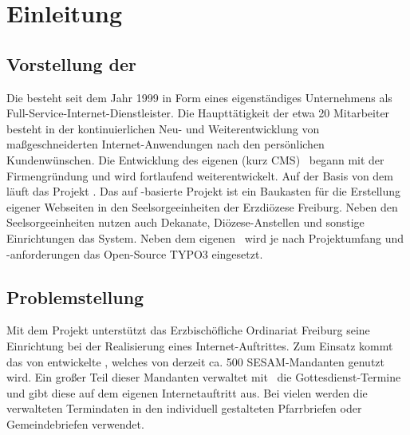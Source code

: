 \chapter{Einleitung}\label{einleitung}

\section{Vorstellung der \webco}
Die \webco besteht seit dem Jahr 1999 in Form eines eigenständiges Unternehmens als Full-Service-Internet-Dienstleister. Die Haupttätigkeit der etwa 20 Mitarbeiter besteht in der kontinuierlichen Neu- und Weiterentwicklung von maßgeschneiderten Internet-Anwendungen nach den persönlichen Kundenwünschen. Die Entwicklung des eigenen \cms (kurz CMS) \edith \, begann mit der Firmengründung und wird fortlaufend weiterentwickelt. Auf der Basis von dem \cmsEdith\, läuft das Projekt \qmUO{\sesam}. 
\abschnitt
Das auf \edith-basierte Projekt \qmUO{\sesam} ist ein Baukasten für die Erstellung eigener Webseiten in den Seelsorgeeinheiten der Erzdiözese Freiburg. Neben den Seelsorgeeinheiten nutzen auch Dekanate, Diözese-Anstellen und sonstige Einrichtungen das System.
\abschnitt
Neben dem eigenen \cmsEdith\, wird je nach Projektumfang und -anforderungen das Open-Source \cms TYPO3 eingesetzt.


\section{Problemstellung} \label{problemstellung}
Mit dem Projekt  unterstützt das Erzbischöfliche Ordinariat Freiburg seine Einrichtung bei der Realisierung eines Internet-Auftrittes. Zum Einsatz kommt das von \webco entwickelte \cmsEdith, welches von derzeit ca. 500 SESAM-Mandanten genutzt wird.
\abschnitt
Ein großer Teil dieser Mandanten verwaltet mit \edith\, die Gottesdienst-Termine und gibt diese auf dem eigenen Internetauftritt aus. Bei vielen werden die verwalteten Termindaten in den individuell gestalteten Pfarrbriefen oder Gemeindebriefen verwendet.


